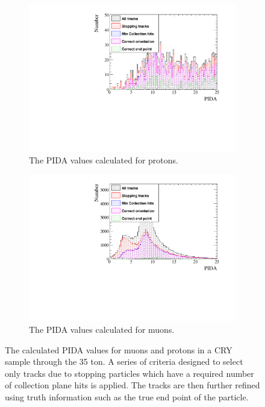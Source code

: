 \begin{figure}[h!]
  \centering
  \begin{subfigure}{.45\textwidth}
        \centering
        \includegraphics[width=\textwidth]{EnrinchedSample_500V_v06_18_00_Proton_PIDA}
        \caption{The PIDA values calculated for protons.}
        \label{fig:CRY_PIDA_Proton}
  \end{subfigure}
  \hspace{0.08\textwidth}
  \begin{subfigure}{.45\textwidth}
        \centering
        \includegraphics[width=\textwidth]{EnrinchedSample_500V_v06_18_00_Muon_PIDA}
        \caption{The PIDA values calculated for muons.}
        \label{fig:CRY_PIDA_Muon}
  \end{subfigure}
  \caption[The calculated PIDA values for muons and protons in a CRY sample through the 35 ton]
          {The calculated PIDA values for muons and protons in a CRY sample through the 35 ton. A series of criteria designed to select only tracks due to stopping particles which have a required number of collection plane hits is applied. The tracks are then further refined using truth information such as the true end point of the particle.}
  \label{fig:CRY_PIDA}
\end{figure}
